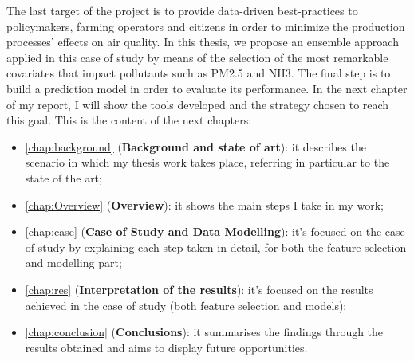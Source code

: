 The last target of the project is to provide data-driven best-practices to policymakers, farming operators and citizens in order to minimize the production processes' effects on air quality.
\bigskip
In this thesis, we propose an ensemble approach applied in this case of study by means of the selection of the most remarkable covariates that impact pollutants such as PM2.5 and NH3. 
The final step is to build a prediction model in order to evaluate its performance.  
In the next chapter of my report, I will show the tools developed and the strategy chosen to reach this goal. 
This is the content of the next chapters:

\begin{itemize}
  \item \autoref{chap:background} (\textbf{Background and state of art}): it describes the scenario in which my thesis work takes place, referring in particular to the state of the art;
  \item \autoref{chap:Overview} (\textbf{Overview}): it shows the main steps I take in my work;
  \item \autoref{chap:case} (\textbf{Case of Study and Data Modelling}): it's focused on the case of study by explaining each step taken in detail, for both the feature selection and modelling part;
 \item \autoref{chap:res} (\textbf{Interpretation of the results}): it's focused on the results achieved in the case of study (both feature selection and models);
 \item \autoref{chap:conclusion} (\textbf{Conclusions}): it summarises the findings through the results obtained and aims to display future opportunities.  
\end{itemize}

